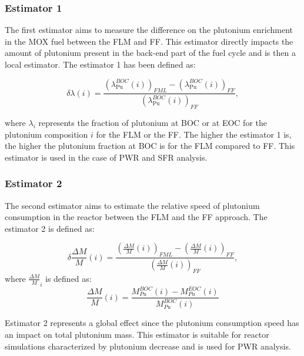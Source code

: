 \subsubsection{Estimator 1}

The first estimator aims to measure the difference on the plutonium enrichment
in the MOX fuel between the \gls{FLM} and \gls{FF}. This estimator directly
impacts the amount of plutonium present in the back-end part of the fuel cycle
and is then a local estimator. The estimator 1 has been defined as:

\begin{equation}
    \delta{\lambda}(i) =
        \frac{\left(\lambda_{\mathrm{Pu}}^{BOC}(i)\right)_{FML}
              - \left(\lambda_{\mathrm{Pu}}^{BOC}(i)\right)_{FF}}
              {\left(\lambda_{\mathrm{Pu}}^{BOC}(i)\right)_{FF}},
\end{equation}

where $\lambda_i$ represents the fraction of plutonium at \gls{BOC} or at
\gls{EOC} for the plutonium composition $i$ for the \gls{FLM} or the \gls{FF}.
The higher the estimator 1 is, the higher the plutonium fraction at \gls{BOC} is
for the \gls{FLM} compared to \gls{FF}. This estimator is used in the case of
\gls{PWR} and \gls{SFR} analysis.

\subsubsection{Estimator 2}

The second estimator aims to estimate the relative speed of plutonium
consumption in the reactor between the \gls{FLM} and the \gls{FF} approach. The
estimator 2 is defined as:

\begin{equation}
    \delta{\frac{\Delta M}{M}}(i) =
        \frac{\left(\frac{\Delta M}{M}(i)\right)_{FML}
              - \left(\frac{\Delta M}{M}(i)\right)_{FF}}
             {\left(\frac{\Delta M}{M}(i)\right)_{FF}},
\end{equation}
where $\frac{\Delta M}{M}_{i}$ is defined as:
\begin{equation}
    \frac{\Delta M}{M}(i) = \frac{M_{Pu}^{BOC}(i) -
    M_{Pu}^{EOC}(i)}{M_{Pu}^{BOC}(i)}
\end{equation}

Estimator 2 represents a global effect since the plutonium consumption speed has
an impact on total plutonium mass. This estimator is suitable for reactor
simulations characterized by plutonium decrease and is used for PWR analysis.

